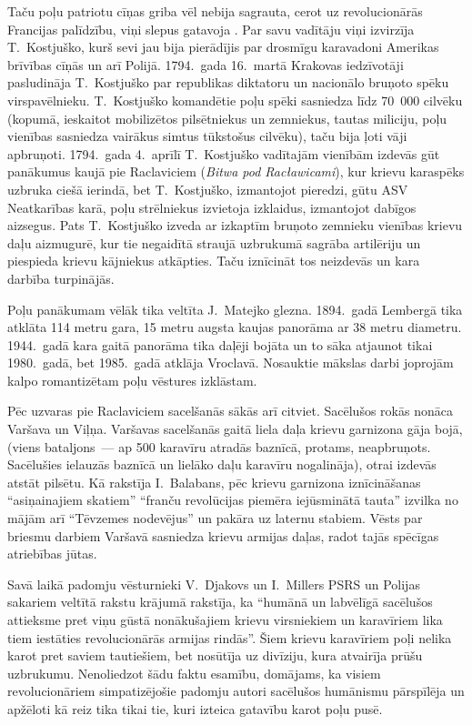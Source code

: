 \documentclass[twoside,a5paper,12pt,fleqn,openany]{extbook}
\newcommand{\pltxti}[1]{\textit{\textpolish{#1}}}
\begin{document}
Taču poļu patriotu cīņas griba vēl nebija sagrauta, cerot uz revolucionārās Francijas palīdzību, viņi slepus gatavoja . Par savu vadītāju viņi izvirzīja T.~Kostjuško, kurš sevi jau bija pierādījis par drosmīgu karavadoni Amerikas brīvības cīņās un arī Polijā. 1794.~gada 16.~martā Krakovas iedzīvotāji pasludināja T.~Kostjuško par republikas diktatoru un nacionālo bruņoto spēku virspavēlnieku. T.~Kostjuško komandētie poļu spēki sasniedza līdz 70~000 cilvēku (kopumā, ieskaitot mobilizētos pilsētniekus un zemniekus, tautas miliciju, poļu vienības sasniedza vairākus simtus tūkstošus cilvēku), taču bija ļoti vāji apbruņoti. 1794.~gada 4.~aprīlī T.~Kostjuško vadītajām vienībām izdevās gūt panākumus kaujā pie Raclaviciem (\pltxti{Bitwa pod Racławicami}), kur krievu karaspēks uzbruka ciešā ierindā, bet T.~Kostjuško, izmantojot pieredzi, gūtu ASV Neatkarības karā, poļu strēlniekus izvietoja izklaidus, izmantojot dabīgos aizsegus. Pats T.~Kostjuško izveda ar izkaptīm bruņoto zemnieku vienības krievu daļu aizmugurē, kur tie negaidītā straujā uzbrukumā sagrāba artilēriju un piespieda krievu kājniekus atkāpties. Taču iznīcināt tos neizdevās un kara darbība turpinājās.

Poļu panākumam vēlāk tika veltīta J.~Matejko glezna. 1894.~gadā Lembergā tika atklāta 114 metru gara, 15 metru augsta kaujas panorāma ar 38 metru diametru. 1944.~gadā kara gaitā panorāma tika daļēji bojāta un to sāka atjaunot tikai 1980.~gadā, bet 1985.~gadā atklāja Vroclavā. Nosauktie mākslas darbi joprojām kalpo romantizētam poļu vēstures izklāstam.

Pēc uzvaras pie Raclaviciem sacelšanās sākās arī citviet. Sacēlušos rokās nonāca Varšava un Viļņa. Varšavas sacelšanās gaitā liela daļa krievu garnizona gāja bojā, (viens bataljons~--- ap 500 karavīru atradās baznīcā, protams, neapbruņots. Sacēlušies ielauzās baznīcā un lielāko daļu karavīru nogalināja), otrai izdevās atstāt pilsētu. Kā rakstīja I.~Balabans, pēc krievu garnizona iznīcināšanas ``asiņainajiem skatiem'' ``franču revolūcijas piemēra iejūsminātā tauta'' izvilka no mājām arī ``Tēvzemes nodevējus'' un pakāra uz laternu stabiem. Vēsts par briesmu darbiem Varšavā sasniedza krievu armijas daļas, radot tajās spēcīgas atriebības jūtas.

Savā laikā padomju vēsturnieki V.~Djakovs un I.~Millers PSRS un Polijas sakariem veltītā rakstu krājumā rakstīja, ka ``humānā un labvēlīgā sacēlušos attieksme pret viņu gūstā nonākušajiem krievu virsniekiem un karavīriem lika tiem iestāties revolucionārās armijas rindās''. Šiem krievu karavīriem poļi nelika karot pret saviem tautiešiem, bet nosūtīja uz divīziju, kura atvairīja prūšu uzbrukumu. Nenoliedzot šādu faktu esamību, domājams, ka visiem revolucionāriem simpatizējošie padomju autori sacēlušos humānismu pārspīlēja un apžēloti kā reiz tika tikai tie, kuri izteica gatavību karot poļu pusē.
\end{document}

